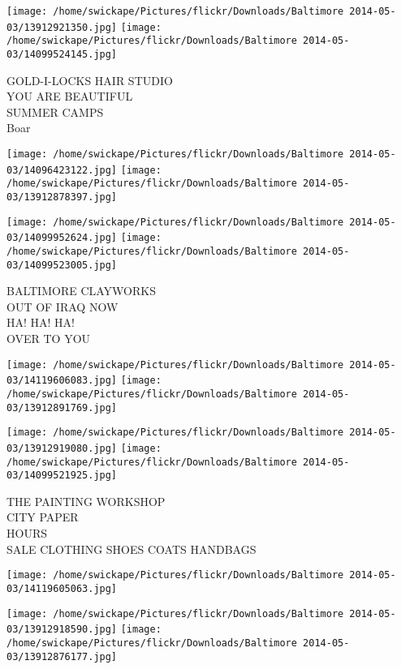 \documentclass[10pt,letterpaper]{article}
\begin{document}
\texttt{[image: /home/swickape/Pictures/flickr/Downloads/Baltimore 2014-05-03/13912921350.jpg]}
\texttt{[image: /home/swickape/Pictures/flickr/Downloads/Baltimore 2014-05-03/14099524145.jpg]}

GOLD{-}I{-}LOCKS HAIR STUDIO\\
YOU ARE BEAUTIFUL\\
SUMMER CAMPS\\
Boar\\
\pagebreak

\texttt{[image: /home/swickape/Pictures/flickr/Downloads/Baltimore 2014-05-03/14096423122.jpg]}
\texttt{[image: /home/swickape/Pictures/flickr/Downloads/Baltimore 2014-05-03/13912878397.jpg]}

\texttt{[image: /home/swickape/Pictures/flickr/Downloads/Baltimore 2014-05-03/14099952624.jpg]}
\texttt{[image: /home/swickape/Pictures/flickr/Downloads/Baltimore 2014-05-03/14099523005.jpg]}

BALTIMORE CLAYWORKS\\
OUT OF IRAQ NOW\\
HA! HA! HA!\\
OVER TO YOU\\
\pagebreak

\texttt{[image: /home/swickape/Pictures/flickr/Downloads/Baltimore 2014-05-03/14119606083.jpg]}
\texttt{[image: /home/swickape/Pictures/flickr/Downloads/Baltimore 2014-05-03/13912891769.jpg]}

\texttt{[image: /home/swickape/Pictures/flickr/Downloads/Baltimore 2014-05-03/13912919080.jpg]}
\texttt{[image: /home/swickape/Pictures/flickr/Downloads/Baltimore 2014-05-03/14099521925.jpg]}

THE PAINTING WORKSHOP\\
CITY PAPER\\
HOURS\\
SALE CLOTHING SHOES COATS HANDBAGS\\
\pagebreak

\texttt{[image: /home/swickape/Pictures/flickr/Downloads/Baltimore 2014-05-03/14119605063.jpg]}

\vspace{0.25in}
\texttt{[image: /home/swickape/Pictures/flickr/Downloads/Baltimore 2014-05-03/13912918590.jpg]}
\texttt{[image: /home/swickape/Pictures/flickr/Downloads/Baltimore 2014-05-03/13912876177.jpg]}
\end{document}
